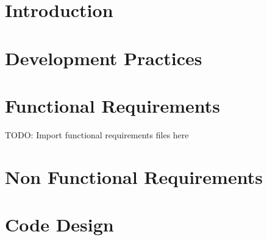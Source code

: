 



\chapter{Introduction}








\chapter{Development Practices}







\chapter{Functional Requirements}


TODO: Import functional requirements files here




\newpage



\chapter{Non Functional Requirements}




\chapter{Code Design}






